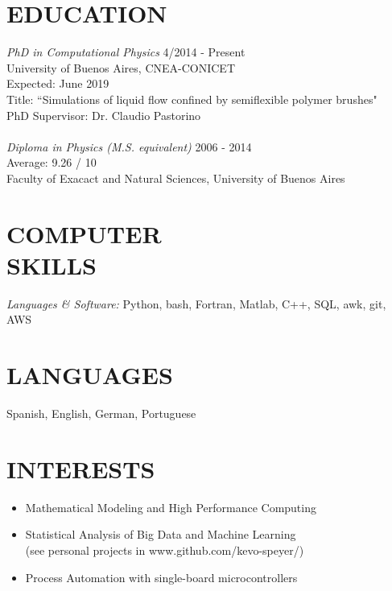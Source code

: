 \documentclass[margin]{res}
\begin{document}
\begin{resume}
\section{EDUCATION} {\sl PhD in Computational Physics}  \hfill 4/2014 - Present \\
                University of Buenos Aires, CNEA-CONICET \\ 
                Expected: June 2019 \\
                Title: ``Simulations of liquid flow confined by semiflexible 
		polymer brushes"  \\
                PhD Supervisor: Dr. Claudio Pastorino \\ 
		\\
 		{\sl Diploma in Physics (M.S. equivalent) }  \hfill 2006 - 2014 \\ 
		Average: 9.26 / 10 \\
		Faculty of Exacact and Natural Sciences, University of Buenos Aires

 
\section{COMPUTER \\ SKILLS} {\sl Languages \& Software:} Python, bash, 
		Fortran, Matlab, C++, SQL, awk, git, AWS 
               
 
\section{LANGUAGES}  Spanish, English, German, Portuguese 

\section{INTERESTS}        
       \begin{itemize}  \itemsep -2pt %
        \item	Mathematical Modeling and High Performance Computing 
	\item   Statistical Analysis of Big Data and Machine Learning \\ 
	    	(see personal projects in www.github.com/kevo-speyer/) 
    	\item	Process Automation with single-board microcontrollers 
       \end{itemize}
 

\end{resume}
\end{document}
